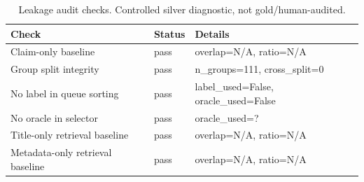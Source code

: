 \begin{table}[ht]
\centering
\caption{Leakage audit checks. Controlled silver diagnostic, not gold/human-audited.}
\label{tab:leakage_audit}
\begin{tabular}{lll}
\toprule
Check & Status & Details \\
\midrule
Claim-only baseline & pass & overlap=N/A, ratio=N/A \\
Group split integrity & pass & n_groups=111, cross_split=0 \\
No label in queue sorting & pass & label_used=False, oracle_used=False \\
No oracle in selector & pass & oracle_used=? \\
Title-only retrieval baseline & pass & overlap=N/A, ratio=N/A \\
Metadata-only retrieval baseline & pass & overlap=N/A, ratio=N/A \\
\bottomrule
\end{tabular}
\end{table}